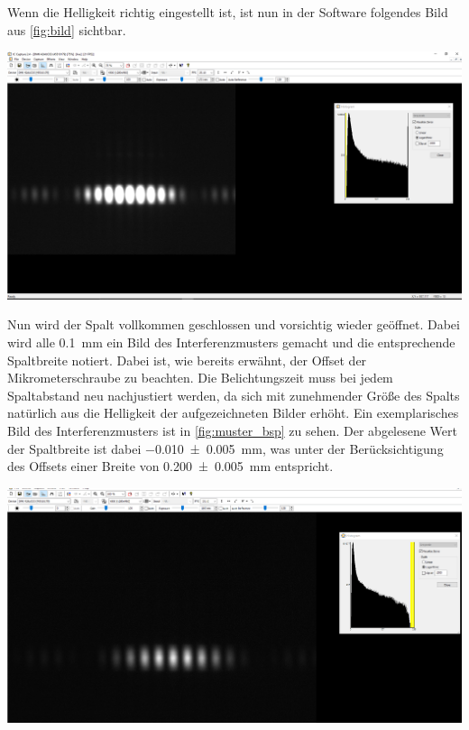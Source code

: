 \documentclass[11pt,ngerman]{scrartcl}
\begin{document}
\noindent Wenn die Helligkeit richtig eingestellt ist, ist nun in der Software folgendes Bild aus \autoref{fig:bild} sichtbar.

\begin{center}
	\begin{minipage}[t]{0.7\textwidth}
		\includegraphics[width=\textwidth]{Interfero/Versuch1/viele_ordnungen}
		\label{fig:bild}
	\end{minipage}
\end{center}

\noindent Nun wird der Spalt vollkommen geschlossen und vorsichtig wieder geöffnet. Dabei wird alle \SI{0.1}{mm} ein Bild des Interferenzmusters gemacht und die entsprechende Spaltbreite notiert. Dabei ist, wie bereits erwähnt, der Offset der Mikrometerschraube zu beachten. Die Belichtungszeit muss bei jedem Spaltabstand neu nachjustiert werden, da sich mit zunehmender Größe des Spalts natürlich aus die Helligkeit der aufgezeichneten Bilder erhöht. Ein exemplarisches Bild des Interferenzmusters ist in \autoref{fig:muster_bsp} zu sehen. Der abgelesene Wert der Spaltbreite ist dabei \SI{-0.010(5)}{mm}, was unter der Berücksichtigung des Offsets einer Breite von \SI{0.200(5)}{mm} entspricht.

\begin{center}
	\begin{minipage}[t]{0.7\textwidth}
		\includegraphics[width=\textwidth]{Interfero/Versuch1/-0_01konstrast}
		\label{fig:muster_bsp}
	\end{minipage}
\end{center}
\end{document}
